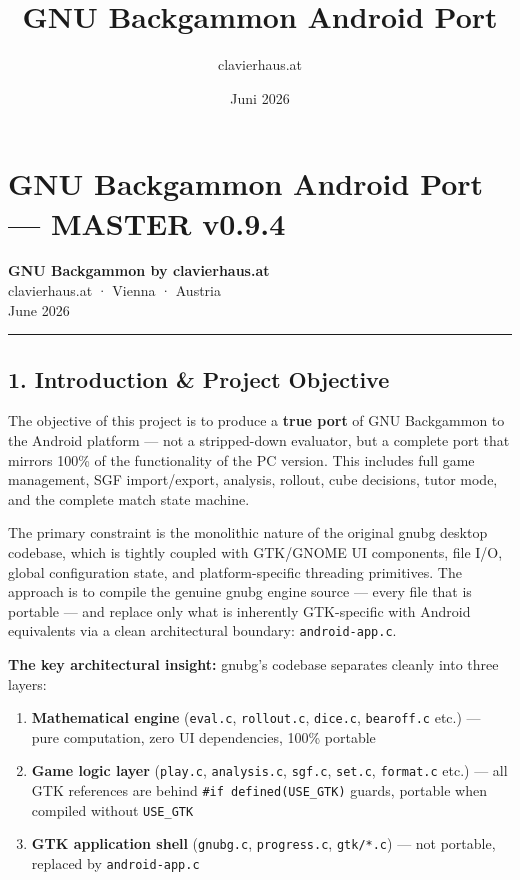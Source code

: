 \documentclass[11pt,a4paper]{article}
\title{\textbf{GNU Backgammon Android Port}}
\author{clavierhaus.at}
\date{Juni 2026}
\providecommand{\tightlist}{\setlength{\itemsep}{2pt}\setlength{\parskip}{0pt}}
\begin{document}
\maketitle\thispagestyle{fancy}

\tableofcontents\newpage

\section{GNU Backgammon Android Port --- MASTER v0.9.4}\label{gnu-backgammon-android-port-master-v09}

\textbf{GNU Backgammon by clavierhaus.at}\\
clavierhaus.at · Vienna · Austria\\
June 2026

\begin{center}\rule{0.5\linewidth}{0.5pt}\end{center}

\subsection{1. Introduction \& Project
Objective}\label{introduction-project-objective}

The objective of this project is to produce a \textbf{true port} of GNU
Backgammon to the Android platform --- not a stripped-down evaluator,
but a complete port that mirrors 100\% of the functionality of the PC
version. This includes full game management, SGF import/export,
analysis, rollout, cube decisions, tutor mode, and the complete match
state machine.

The primary constraint is the monolithic nature of the original gnubg
desktop codebase, which is tightly coupled with GTK/GNOME UI components,
file I/O, global configuration state, and platform-specific threading
primitives. The approach is to compile the genuine gnubg engine source
--- every file that is portable --- and replace only what is inherently
GTK-specific with Android equivalents via a clean architectural
boundary: \texttt{android-app.c}.

\textbf{The key architectural insight:} gnubg's codebase separates
cleanly into three layers:

\begin{enumerate}
\def\labelenumi{\arabic{enumi}.}
\tightlist
\item
  \textbf{Mathematical engine} (\texttt{eval.c}, \texttt{rollout.c},
  \texttt{dice.c}, \texttt{bearoff.c} etc.) --- pure computation, zero
  UI dependencies, 100\% portable
\item
  \textbf{Game logic layer} (\texttt{play.c}, \texttt{analysis.c},
  \texttt{sgf.c}, \texttt{set.c}, \texttt{format.c} etc.) --- all GTK
  references are behind \texttt{\#if\ defined(USE\_GTK)} guards,
  portable when compiled without \texttt{USE\_GTK}
\item
  \textbf{GTK application shell} (\texttt{gnubg.c}, \texttt{progress.c},
  \texttt{gtk/*.c}) --- not portable, replaced by \texttt{android-app.c}
\end{enumerate}
\end{document}
